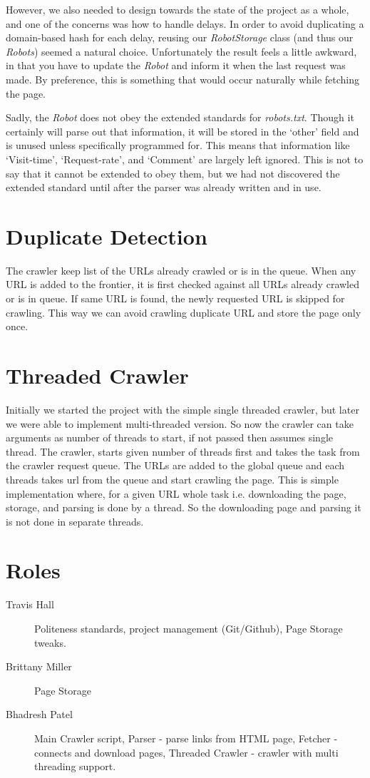 \documentclass[letterpaper,11pt,twoside]{article}
\begin{document}
However, we also needed to design towards the state of the project as a whole, and one of the concerns was how to handle delays. In order to avoid duplicating a domain-based hash for each delay, reusing our \emph{RobotStorage} class (and thus our \emph{Robots}) seemed a natural choice. Unfortunately the result feels a little awkward, in that you have to update the \emph{Robot} and inform it when the last request was made. By preference, this is something that would occur naturally while fetching the page.

Sadly, the \emph{Robot} does not obey the extended standards for \emph{robots.txt}. Though it certainly will parse out that information, it will be stored in the `other' field and is unused unless specifically programmed for. This means that information like `Visit-time', `Request-rate', and `Comment' are largely left ignored. This is not to say that it cannot be extended to obey them, but we had not discovered the extended standard until after the parser was already written and in use.

\section{Duplicate Detection}
The crawler keep list of the URLs already crawled or is in the queue. When any URL is added to the frontier, it is first checked against all URLs already crawled or is in queue. If same URL is found, the newly requested URL is skipped for crawling. This way we can avoid crawling duplicate URL and store the page only once.

\section{Threaded Crawler}
Initially we started the project with the simple single threaded crawler, but later we were able to implement multi-threaded version. So now the crawler can take arguments as number of threads to start, if not passed then assumes single thread. The crawler, starts given number of threads first and takes the task from the crawler request queue. The URLs are added to the global queue and each threads takes url from the queue and start crawling the page. This is simple implementation where, for a given URL whole task i.e. downloading the page, storage, and parsing is done by a thread. So the downloading page and parsing it is not done in separate threads. 

\section{Roles}

\begin{description}
 \item[Travis Hall] Politeness standards, project management (Git/Github), Page Storage tweaks.
 \item[Brittany Miller] Page Storage
 \item[Bhadresh Patel] Main Crawler script, Parser - parse links from HTML page, Fetcher - connects and download pages, Threaded Crawler - crawler with multi threading support.
\end{description}
\end{document}

